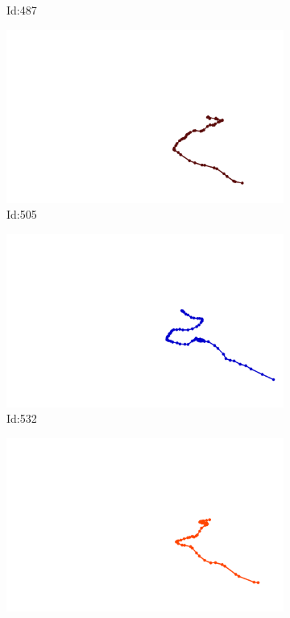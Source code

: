 \documentclass[12pt,twoside]{report}
\begin{document}
\begin{figure}
\begin{subfigure}[b]{0.20\textwidth}
\caption{Id:487}
\end{subfigure}
\begin{subfigure}[b]{0.20\textwidth}
\centering
\includegraphics[width=\textwidth]{../trajectories/505.png}
\caption{Id:505}
\end{subfigure}
\begin{subfigure}[b]{0.20\textwidth}
\centering
\includegraphics[width=\textwidth]{../trajectories/532.png}
\caption{Id:532}
\end{subfigure}
\begin{subfigure}[b]{0.20\textwidth}
\centering
\includegraphics[width=\textwidth]{../trajectories/597.png}

\end{subfigure}
\end{figure}
\end{document}

